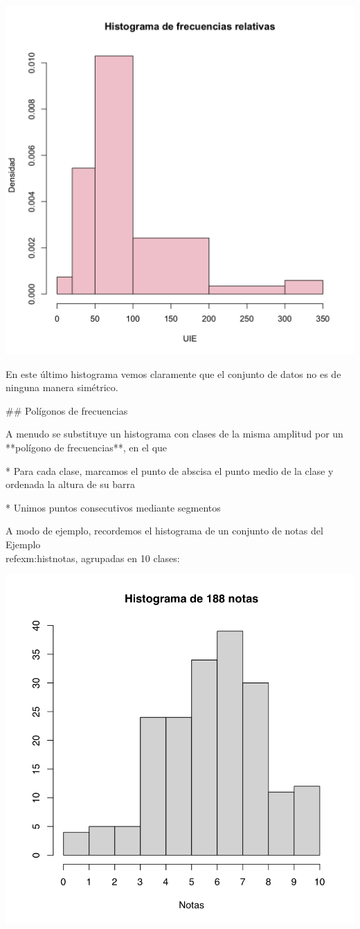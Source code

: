 \documentclass[
]{book}
\theoremstyle{definition}
\theoremstyle{definition}
\theoremstyle{definition}
\theoremstyle{definition}
\theoremstyle{remark}
\begin{document}
\begin{center}\includegraphics[width=0.6\linewidth]{INREMDN_files/figure-html/urine4} \end{center}

En este último histograma vemos claramente que el conjunto de datos no es de ninguna manera simétrico.

## Polígonos de frecuencias

A menudo se substituye un histograma con clases de la misma amplitud por un **polígono de frecuencias**, en el que

* Para cada clase, marcamos el punto de abscisa el punto medio de la clase y ordenada la altura de su barra

* Unimos puntos consecutivos mediante segmentos

A modo de ejemplo, recordemos el histograma de un conjunto de notas del Ejemplo \\ref{exm:histnotas}, agrupadas en 10 clases:


\begin{center}\includegraphics[width=0.6\linewidth]{INREMDN_files/figure-html/histnotas11} \end{center}
\end{document}
